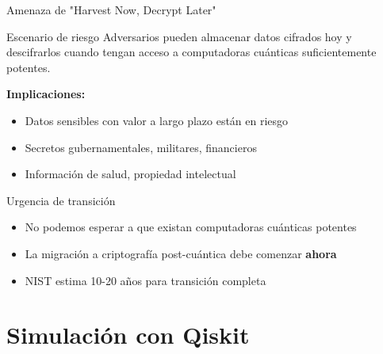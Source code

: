 \documentclass[aspectratio=169]{beamer}
\begin{document}
\begin{frame}{Amenaza de "Harvest Now, Decrypt Later"}
\begin{alertblock}{Escenario de riesgo}
Adversarios pueden almacenar datos cifrados hoy y descifrarlos cuando tengan acceso a computadoras cuánticas suficientemente potentes.
\end{alertblock}

\vspace{0.3cm}
\textbf{Implicaciones:}
\begin{itemize}
\item Datos sensibles con valor a largo plazo están en riesgo
\item Secretos gubernamentales, militares, financieros
\item Información de salud, propiedad intelectual
\end{itemize}

\vspace{0.3cm}
\begin{block}{Urgencia de transición}
\begin{itemize}
\item No podemos esperar a que existan computadoras cuánticas potentes
\item La migración a criptografía post-cuántica debe comenzar \textbf{ahora}
\item NIST estima 10-20 años para transición completa
\end{itemize}
\end{block}
\end{frame}

\section{Simulación con Qiskit}
\end{document}
